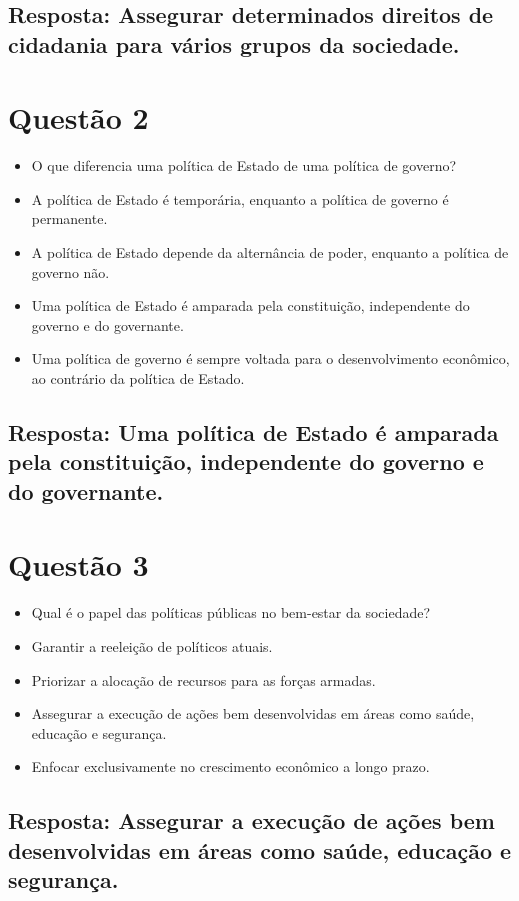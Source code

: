 \documentclass[
   article,       
   12pt,          
   oneside,       
   a4paper,       
   english,       
   brazil,        
   sumario=tradicional
   ]{abntex2}
\begin{document}
\subsection{Resposta: Assegurar determinados direitos de cidadania para vários grupos da sociedade.}

\section{Questão 2}
\begin{itemize}
    \item O que diferencia uma política de Estado de uma política de governo?
    \item A política de Estado é temporária, enquanto a política de governo é permanente.
    \item A política de Estado depende da alternância de poder, enquanto a política de governo não.
    \item Uma política de Estado é amparada pela constituição, independente do governo e do governante.
    \item Uma política de governo é sempre voltada para o desenvolvimento econômico, ao contrário da política de Estado.
\end{itemize}
\subsection{Resposta: Uma política de Estado é amparada pela constituição, independente do governo e do governante.}

\section{Questão 3}
\begin{itemize}
    \item Qual é o papel das políticas públicas no bem-estar da sociedade?
    \item Garantir a reeleição de políticos atuais.
    \item Priorizar a alocação de recursos para as forças armadas.
    \item Assegurar a execução de ações bem desenvolvidas em áreas como saúde, educação e segurança.
    \item Enfocar exclusivamente no crescimento econômico a longo prazo.
\end{itemize}
\subsection{Resposta: Assegurar a execução de ações bem desenvolvidas em áreas como saúde, educação e segurança.}
\end{document}

